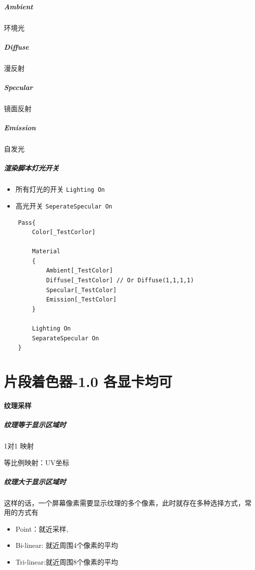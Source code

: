\documentclass[UTF8,a4paper,12pt]{ctexbook}
\begin{document}
			\subparagraph{Ambient} 环境光
			
			\subparagraph{Diffuse} 漫反射
			
			\subparagraph{Specular} 镜面反射
			
			\subparagraph{Emission} 自发光
	
			\subparagraph{渲染脚本灯光开关}
				\begin{itemize}
					\item 所有灯光的开关 \verb|Lighting On|
					\item 高光开关 \verb|SeperateSpecular On|
				\end{itemize}
			
			\begin{lstlisting}
	Pass{
		Color[_TestCorlor]
		
		Material
		{
			Ambient[_TestColor]
			Diffuse[_TestColor] // Or Diffuse(1,1,1,1) 
			Specular[_TestColor]
			Emission[_TestColor]
		}
		
		Lighting On 
		SeparateSpecular On
	}
			\end{lstlisting}
	\section{片段着色器-1.0 各显卡均可}
		\paragraph{纹理采样}
			\subparagraph{纹理等于显示区域时}
				1对1 映射
				
				等比例映射：UV坐标
									
			\subparagraph{纹理大于显示区域时}
				这样的话，一个屏幕像素需要显示纹理的多个像素，此时就存在多种选择方式，常用的方式有
				\begin{itemize}
					\item Point：就近采样,
					\item Bi-linear: 就近周围4个像素的平均
					\item Tri-linear:就近周围8个像素的平均
				\end{itemize}
			
\end{document}
